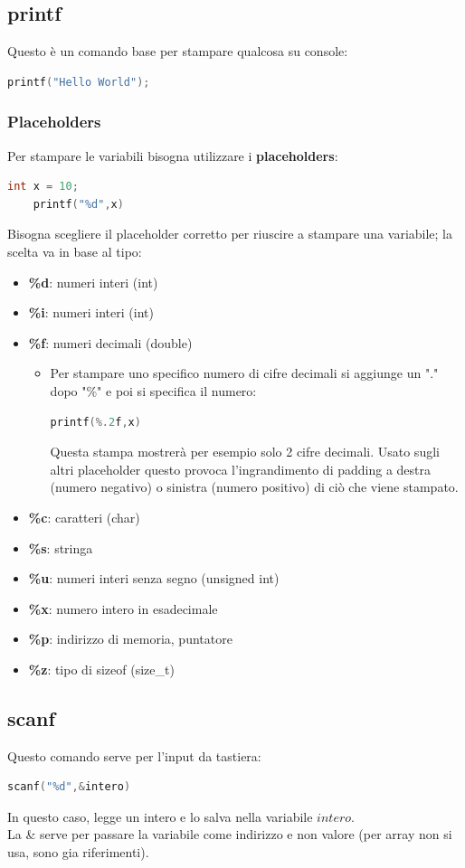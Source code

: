 \documentclass[12pt,a4paper]{article}
\begin{document}
\subsection{printf}
Questo è un comando base per stampare qualcosa su console:
\begin{lstlisting}[language=C]
    printf("Hello World");
\end{lstlisting}
\subsubsection{Placeholders}
Per stampare le variabili bisogna utilizzare i \textbf{placeholders}:
\begin{lstlisting}[language=C]
    int x = 10;
    printf("%d",x)
\end{lstlisting}
Bisogna scegliere il placeholder corretto per riuscire a stampare una variabile; la scelta va in base al tipo:
\begin{itemize}
    \item \textbf{\%d}: numeri interi (int)
    \item \textbf{\%i}: numeri interi (int)
    \item \textbf{\%f}: numeri decimali (double)
    \begin{itemize}
        \item Per stampare uno specifico numero di cifre decimali si aggiunge un "." dopo "\%" e poi si specifica il numero:
        \begin{lstlisting}[language=C]
            printf(%.2f,x)
         \end{lstlisting}
        Questa stampa mostrerà per esempio solo 2 cifre decimali. Usato sugli altri placeholder questo provoca l'ingrandimento di padding a destra (numero negativo) o sinistra (numero positivo) di ciò che viene stampato.
    \end{itemize}
    \item \textbf{\%c}: caratteri (char)
    \item \textbf{\%s}: stringa
    \item \textbf{\%u}: numeri interi senza segno (unsigned int)
    \item \textbf{\%x}: numero intero in esadecimale
    \item \textbf{\%p}: indirizzo di memoria, puntatore
    \item \textbf{\%z}: tipo di sizeof (size\_t)
\end{itemize}
\subsection{scanf}
Questo comando serve per l'input da tastiera:
\begin{lstlisting}[language=C]
    scanf("%d",&intero)
\end{lstlisting}
In questo caso, legge un intero e lo salva nella variabile $intero$.\\
La \& serve per passare la variabile come indirizzo e non valore (per array non si usa, sono gia riferimenti).
\end{document}
